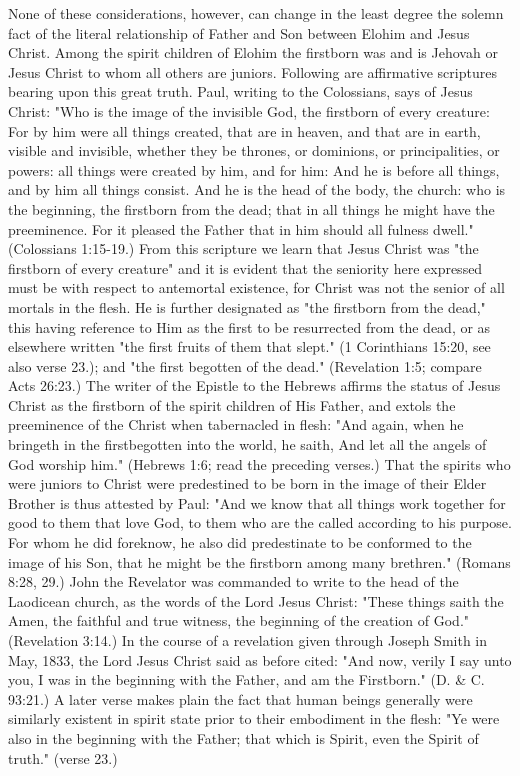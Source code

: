 None of these considerations, however, can change in the least degree the solemn fact of the
literal relationship of Father and Son between Elohim and Jesus Christ. Among the spirit
children of Elohim the firstborn was and is Jehovah or Jesus Christ to whom all others are
juniors. Following are affirmative scriptures bearing upon this great truth. Paul, writing to the
Colossians, says of Jesus Christ: "Who is the image of the invisible God, the firstborn of
every creature: For by him were all things created, that are in heaven, and that are in earth,
visible and invisible, whether they be thrones, or dominions, or principalities, or powers: all
things were created by him, and for him: And he is before all things, and by him all things
consist. And he is the head of the body, the church: who is the beginning, the firstborn from
the dead; that in all things he might have the preeminence. For it pleased the Father that in
him should all fulness dwell." (Colossians 1:15-19.) From this scripture we learn that Jesus
Christ was "the firstborn of every creature" and it is evident that the seniority here expressed
must be with respect to antemortal existence, for Christ was not the senior of all mortals in
the flesh. He is further designated as "the firstborn from the dead," this having reference to
Him as the first to be resurrected from the dead, or as elsewhere written "the first fruits of
them that slept." (1 Corinthians 15:20, see also verse 23.); and "the first begotten of the
dead." (Revelation 1:5; compare Acts 26:23.) The writer of the Epistle to the Hebrews
affirms the status of Jesus Christ as the firstborn of the spirit children of His Father, and
extols the preeminence of the Christ when tabernacled in flesh: "And again, when he bringeth
in the firstbegotten into the world, he saith, And let all the angels of God worship him."
(Hebrews 1:6; read the preceding verses.) That the spirits who were juniors to Christ were
predestined to be born in the image of their Elder Brother is thus attested by Paul: "And we
know that all things work together for good to them that love God, to them who are the called
according to his purpose. For whom he did foreknow, he also did predestinate to be
conformed to the image of his Son, that he might be the firstborn among many brethren."
(Romans 8:28, 29.) John the Revelator was commanded to write to the head of the Laodicean
church, as the words of the Lord Jesus Christ: "These things saith the Amen, the faithful and
true witness, the beginning of the creation of God." (Revelation 3:14.) In the course of a
revelation given through Joseph Smith in May, 1833, the Lord Jesus Christ said as before
cited: "And now, verily I say unto you, I was in the beginning with the Father, and am the
Firstborn." (D. \& C. 93:21.) A later verse makes plain the fact that human beings generally
were similarly existent in spirit state prior to their embodiment in the flesh: "Ye were also in
the beginning with the Father; that which is Spirit, even the Spirit of truth." (verse 23.)


